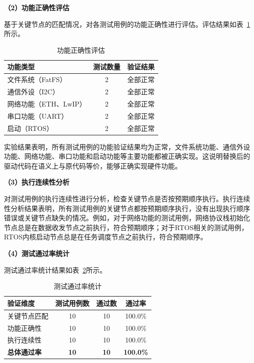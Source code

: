 \textbf{（2）功能正确性评估}

基于关键节点的匹配情况，对各测试用例的功能正确性进行评估。评估结果如表~\ref{tab:function_results}所示。

\begin{table}[htbp]
\centering
\caption{功能正确性评估}
\label{tab:function_results}
\begin{tabular}{lcc}
\toprule
\textbf{功能类型} & \textbf{测试数量} & \textbf{验证结果} \\
\midrule
文件系统（FatFS） & 2 & 全部正常 \\
通信外设（I2C） & 2 & 全部正常 \\
网络功能（ETH、LwIP） & 2 & 全部正常 \\
串口功能（UART） & 2 & 全部正常 \\
启动（RTOS） & 2 & 全部正常 \\
\bottomrule
\end{tabular}
\end{table}

实验结果表明，所有测试用例的功能验证结果均为正常，文件系统功能、通信外设功能、网络功能、串口功能和启动功能等主要功能都被正确实现。这说明替换后的驱动代码在语义上与原代码等价，能够正确实现硬件功能。

\textbf{（3）执行连续性分析}

对测试用例的执行连续性进行分析，检查关键节点是否按预期顺序执行。执行连续性分析结果表明，所有测试用例的关键节点都按预期顺序执行，没有出现执行顺序错误或关键节点缺失的情况。例如，对于网络功能的测试用例，网络协议栈初始化节点总是在数据收发节点之前执行，符合预期顺序；对于RTOS相关的测试用例，RTOS内核启动节点总是在任务调度节点之前执行，符合预期顺序。

\textbf{（4）测试通过率统计}

测试通过率统计结果如表~\ref{tab:pass_results}所示。

\begin{table}[htbp]
\centering
\caption{测试通过率统计}
\label{tab:pass_results}
\begin{tabular}{lccc}
\toprule
\textbf{验证维度} & \textbf{测试用例数} & \textbf{通过数} & \textbf{通过率} \\
\midrule
关键节点匹配 & 10 & 10 & 100.0\% \\
功能正确性 & 10 & 10 & 100.0\% \\
执行连续性 & 10 & 10 & 100.0\% \\
\textbf{总体通过率} & \textbf{10} & \textbf{10} & \textbf{100.0\%} \\
\bottomrule
\end{tabular}
\end{table}

